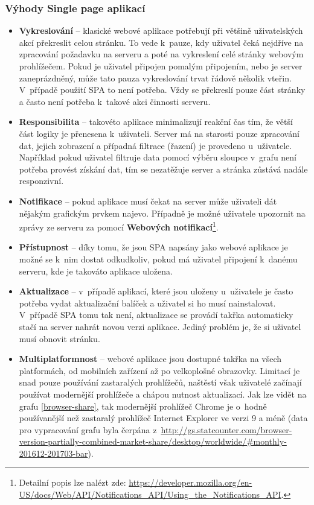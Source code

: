 \subsubsection{Výhody Single page aplikací}
\begin{itemize}
\item \textbf{Vykreslování} -- klasické webové aplikace potřebují při většině uživatelských akcí překreslit celou stránku. To vede k~pauze, kdy uživatel čeká nejdříve na zpracování požadavku na serveru a poté na vykreslení celé stránky webovým prohlížečem. Pokud je uživatel připojen pomalým připojením, nebo je server zaneprázdněný, může tato pauza vykreslování trvat řádově několik vteřin. V~případě použití SPA to není potřeba. Vždy se překreslí pouze část stránky a často není potřeba k~takové akci činnosti serveru.
\item \textbf{Responsibilita} -- takovéto aplikace minimalizují reakční čas tím, že větší část logiky je přenesena k~uživateli. Server má na starosti pouze zpracování dat, jejich zobrazení a případná filtrace (řazení) je provedeno u~uživatele. Například pokud uživatel filtruje data pomocí výběru sloupce v~grafu není potřeba provést získání dat, tím se nezatěžuje server a stránka zůstává nadále responzivní.
\item \textbf{Notifikace} -- pokud aplikace musí čekat na server může uživateli dát nějakým grafickým prvkem najevo. Případně je možné uživatele upozornit na zprávy ze serveru za pomocí \textbf{Webových notifikací}\footnote{Detailní popis lze nalézt zde: \url{https://developer.mozilla.org/en-US/docs/Web/API/Notifications_API/Using_the_Notifications_API}.}.
\item \textbf{Přístupnost} -- díky tomu, že jsou SPA napsány jako webové aplikace je možné se k~nim dostat odkudkoliv, pokud má uživatel připojení k~danému serveru, kde je takováto aplikace uložena.
\item \textbf{Aktualizace} -- v~případě aplikací, které jsou uloženy u~uživatele je často potřeba vydat aktualizační balíček a uživatel si ho musí nainstalovat. V~případě SPA tomu tak není, aktualizace se provádí takřka automaticky stačí na server nahrát novou verzi aplikace. Jediný problém je, že si uživatel musí obnovit stránku.
\item \textbf{Multiplatformnost} -- webové aplikace jsou dostupné takřka na všech platformách, od mobilních zařízení až po velkoplošné obrazovky. Limitací je snad pouze používání zastaralých prohlížečů, naštěstí však uživatelé začínají používat modernější prohlížeče a chápou nutnost aktualizací. Jak lze vidět na grafu \ref{browser-share}, tak modernější prohlížeč Chrome je o~hodně používanější než zastaralý prohlížeč Internet Explorer ve verzi 9 a méně (data pro vypracování grafu byla čerpána z~\url{http://gs.statcounter.com/browser-version-partially-combined-market-share/desktop/worldwide/#monthly-201612-201703-bar}). \cite{SPA}
\end{itemize}
